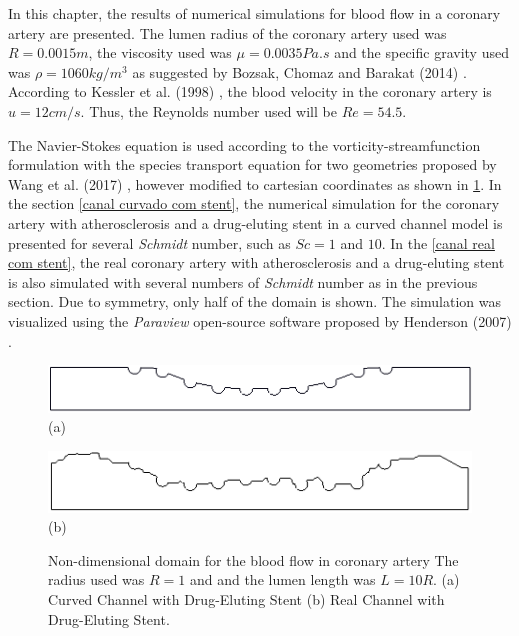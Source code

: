 In this chapter, the results of numerical simulations for 
blood flow in a coronary artery are presented. 
The lumen radius of the coronary artery used was $R=0.0015m$, 
the viscosity used was $\mu=0.0035Pa.s$ and the specific gravity used was
$\rho=1060kg/m^3$ as suggested by Bozsak, Chomaz and Barakat (2014)
 \cite{bozsak2014}. According to Kessler et al. (1998) 
\cite{kessler1998}, the blood velocity in the coronary artery 
is $u=12cm/s$. Thus, the Reynolds number used will be 
$Re=54.5$. 

\medskip
The Navier-Stokes equation is used according to the 
vorticity-streamfunction formulation with 
the species transport equation for two geometries proposed 
by Wang et al. (2017) \cite{wang2017}, however modified to 
cartesian coordinates as shown in \ref{coronary artery geo}. 
In the section \ref{canal curvado com stent}, the numerical 
simulation for the coronary artery with atherosclerosis 
and a drug-eluting stent in a curved channel model 
is presented for several 
\textit{Schmidt} number, such as $Sc=1$ and $10$. 
In the \ref{canal real com stent}, the real coronary 
artery with atherosclerosis and a drug-eluting stent is also 
simulated with several numbers of \textit{Schmidt} number 
as in the previous section.
Due to symmetry, only half of the domain is shown. 
The simulation was visualized using the \textit{Paraview} open-source 
software proposed by Henderson (2007) \cite{paraview}.


\begin{figure}[H]
     \centering
     \begin{minipage}{.45\linewidth}
      \centering
      \includegraphics[scale=0.22]{./02_chaps/cap_solution/figure/CurvedStrut.png}\\
      (a)
     \end{minipage}%
     \begin{minipage}{.45\linewidth}
      \centering
      \includegraphics[scale=0.22]{./02_chaps/cap_solution/figure/RealStrut.png}\\
      (b)
     \end{minipage}
     \medskip
     \caption{Non-dimensional domain for the blood flow in coronary artery
     The radius used was $R=1$ and and the lumen length was $L=10R$.
     (a) Curved Channel with Drug-Eluting Stent
     (b) Real Channel with Drug-Eluting Stent.}
     \label{coronary artery geo}
\end{figure}
